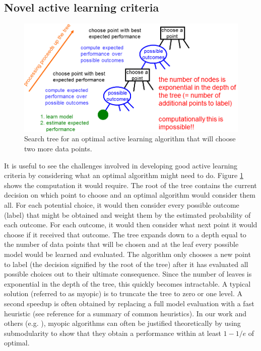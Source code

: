 \documentclass[prd,nofootbib,floatfix,11pt,tightenlines,nofootinbib]{revtex4}
\begin{document}
\subsection{Novel active learning criteria}

\begin{figure}[t]
\centerline{\includegraphics[scale=0.4]{searchtree.png}}
\caption{Search tree for an optimal active learning algorithm that will
  choose two more data points.}
\label{fig:searchtree}
\end{figure}

It is useful to see the challenges involved in developing good active
learning criteria by considering what an optimal algorithm might need to
do.  Figure \ref{fig:searchtree} shows the computation it would require.
The root of the tree contains the current decision on which point to choose
and an optimal algorithm would consider them all.  For each potential
choice, it would then consider every possible outcome (label) that might be
obtained and weight them by the estimated probability of each outcome.  For
each outcome, it would then consider what next point it would choose if it
received that outcome.  The tree expands down to a depth equal to the
number of data points that will be chosen and at the leaf every possible
model would be learned and evaluated.  The algorithm only chooses a new
point to label (the decision signified by the root of the tree) after it
has evaluated all possible choices out to their ultimate consequence.
Since the number of leaves is exponential in the depth of the tree, this
quickly becomes intractable.  A typical solution (referred to as myopic) is
to truncate the tree to zero or one level.  A second speedup is often
obtained by replacing a full model evaluation with a fast heuristic (see
reference \cite{Settles09} for a summary of common heuristics).  In our
work \cite{YifeiMa12} and others (e.g. \cite{Krause08}), myopic algorithms
can often be justified theoretically by using submodularity to show that
they obtain a performance within at least $1 - 1/e$ of optimal.
\end{document}
